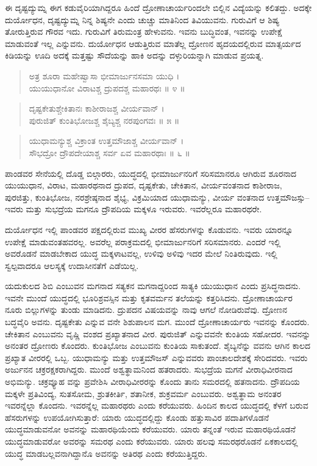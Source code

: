 ಈ ದೃಷ್ಟದ್ಯುಮ್ನ ಈಗ ಕಡುವೈರಿಯಾಗಿದ್ದರೂ ಹಿಂದೆ ದ್ರೋಣಾಚಾರ್ಯರಿಂದಲೇ ಬಿಲ್ಲಿನ ವಿದ್ಯೆಯನ್ನು ಕಲಿತದ್ದು. ಅದಕ್ಕೇ ದುರ್ಯೋಧನ, ದೃಷ್ಟದ್ಯುಮ್ನ ನಿನ್ನ ಶಿಷ್ಯನೇ ಎಂದು ಚುಚ್ಚು ಮಾತಿನಿಂದ ತಿವಿಯುವನು. ಗುರುವಿಗೆ ಆ ಶಿಷ್ಯ ತೋರುತ್ತಿರುವ ಗೌರವ ಇದು. ಗುರುವಿಗೆ ತಿರುಮಂತ್ರ ಹೇಳುವನು. ಇವನು ಬುದ್ಧಿವಂತ, ಇವನನ್ನು ಉಪೇಕ್ಷೆ ಮಾಡುವಂತೆ ಇಲ್ಲ ಎನ್ನುವನು. ದುರ್ಯೋಧನ ಆಡುತ್ತಿರುವ ಮಾತೆಲ್ಲ ದ್ರೋಣನ ಹೃದಯದಲ್ಲಿರುವ ಮಾತ್ಸರ್ಯದ ಕಿಡಿಯನ್ನು ಊದಿ ಅದಕ್ಕೆ ಮತ್ತಷ್ಟು ಸೌದೆಯನ್ನು ಹಾಕಿ ಅದನ್ನು ದಳ್ಳುರಿಯನ್ನಾಗಿ ಮಾಡುವ ಪ್ರಯತ್ನ.

\begin{verse}
ಅತ್ರ ಶೂರಾ ಮಹೇಷ್ವಾಸಾ ಭೀಮಾರ್ಜುನಸಮಾ ಯುಧಿ ।\\ಯುಯುಧಾನೋ ವಿರಾಟಶ್ಚ ದ್ರುಪದಶ್ಚ ಮಹಾರಥಃ \num{॥ ೪ ॥}
\end{verse}

\begin{verse}
ದೃಷ್ಟಕೇತುಶ್ಚೇಕಿತಾನಃ ಕಾಶೀರಾಜಶ್ಚ ವೀರ್ಯವಾನ್ ।\\ಪುರುಜಿತ್ ಕುಂತಿಭೋಜಶ್ಚ ಶೈಬ್ಯಶ್ಚ ನರಪುಂಗವಃ \num{॥ ೫ ॥}
\end{verse}

\begin{verse}
ಯುಧಾಮನ್ಯುಶ್ಚ ವಿಕ್ರಾಂತ ಉತ್ತಮೌಜಾಶ್ಚ ವೀರ್ಯವಾನ್ ।\\ಸೌಭದ್ರೋ ದ್ರೌಪದೇಯಾಶ್ಚ ಸರ್ವ ಏವ ಮಹಾರಥಾಃ \num{॥ ೬ ॥}
\end{verse}

{\small ಪಾಂಡವರ ಸೇನೆಯಲ್ಲಿ ದೊಡ್ಡ ಬಿಲ್ಗಾರರು, ಯುದ್ಧದಲ್ಲಿ ಭೀಮಾರ್ಜುನರಿಗೆ ಸರಿಸಮಾನರೂ ಆಗಿರುವ ಶೂರನಾದ ಯುಯುಧಾನ, ವಿರಾಟ, ಮಹಾರಥನಾದ ದ್ರುಪದ, ದೃಷ್ಟಕೇತು, ಚೇಕಿತಾನ, ವೀರ್ಯವಂತನಾದ ಕಾಶೀರಾಜ, ಪುರಜಿತ್ತು, ಕುಂತಿಭೋಜ, ನರಶ್ರೇಷ್ಠನಾದ ಶೈಭ್ಯ, ವಿಕ್ರಮಿಯಾದ ಯುಧಾಮನ್ಯು, ವೀರ್ಯ ವಂತನಾದ ಉತ್ತಮೌಜಸ್ಸು–ಇವರು ಮತ್ತು ಸುಭದ್ರೆಯ ಮಗನೂ ದ್ರೌಪದಿಯ ಮಕ್ಕಳೂ ಇರುವರು. ಇವರೆಲ್ಲರೂ ಮಹಾರಥರೇ.}

ದುರ್ಯೋಧನ ಇಲ್ಲಿ ಪಾಂಡವರ ಪಕ್ಷದಲ್ಲಿರುವ ಮುಖ್ಯ ವೀರರ ಹೆಸರುಗಳನ್ನು ಕೊಡುವನು. ಇವರು ಯಾರನ್ನೂ ಉಪೇಕ್ಷೆ ಮಾಡುವಂತಹವರಲ್ಲ. ಅವರೆಲ್ಲ ಪರಾಕ್ರಮದಲ್ಲಿ ಭೀಮಾರ್ಜುನರಿಗೆ ಸರಿಸಮಾನರು. ಎಂದರೆ ಇಲ್ಲಿ ಅವರೊಡನೆ ಮಾಡಬೇಕಾದ ಯುದ್ಧ ಮಕ್ಕಳಾಟವಲ್ಲ, ಉಳಿವು ಅಳಿವು ಇದರ ಮೇಲೆ ನಿಂತಿರುವುದು. ಇಲ್ಲಿ ಸ್ವಲ್ಪವಾದರೂ ಆಲಸ್ಯಕ್ಕೆ ಉದಾಸೀನತೆಗೆ ಎಡೆಯಿಲ್ಲ.

ಯದುಕುಲದ ಶಿಬಿ ಎಂಬುವನ ಮಗನಾದ ಸತ್ಯಕನ ಮಗನಾದ್ದರಿಂದ ಸಾತ್ಯಕಿ ಯುಯುಧಾನ ಎಂದು ಪ್ರಸಿದ್ಧನಾದನು. ಇವನೇ ಮುಂದೆ ಯುದ್ಧದಲ್ಲಿ ಭೂರಿಶ್ರವಸ್ಸಿನ ಮತ್ತು ಕೃತವರ್ಮನ ತಲೆಯನ್ನು ಕತ್ತರಿಸಿದನು. ದ್ರೋಣಾಚಾರ್ಯರ ನೂರು ಬಿಲ್ಲುಗಳನ್ನು ತುಂಡು ಮಾಡಿದನು. ದ್ರುಪದನ ವಿಷಯವನ್ನು ನಾವು ಆಗಲೆ ನೋಡಿರುವೆವು. ದ್ರೋಣನ ಬದ್ಧವೈರಿ ಅವನು. ದೃಷ್ಟಕೇತು ಎನ್ನುವ ವನೇ ಶಿಶುಪಾಲನ ಮಗ. ಮುಂದೆ ದ್ರೋಣಾಚಾರ್ಯರು ಇವನನ್ನು ಕೊಂದರು. ಚೇಕಿತಾನ ಎಂಬುವನು ವೃಷ್ಣಿ ವಂಶದ ಪ್ರಖ್ಯಾತನಾದ ವೀರ. ಪುರುಜಿತ್ ಎನ್ನುವವನೇ ಕುಂತಿಯ ಸಹೋದರ. ಇವನನ್ನು ಅನಂತರ ದ್ರೋಣರು ಕೊಂದರು. ಕುಂತಿಭೋಜ ಎಂಬುವನು ಕುಂತಿಯ ಸಾಕುತಂದೆ. ಶೈಬ್ಯನೆನ್ನು ವವನು ಆಗಿನ ಕಾಲದ ಪ್ರಖ್ಯಾತ ವೀರರಲ್ಲಿ ಒಬ್ಬ. ಯುಧಾಮನ್ಯು ಮತ್ತು ಉತ್ತಮೌಜಸ್ ಎನ್ನುವವರು ಪಾಂಚಾಲದೇಶಕ್ಕೆ ಸೇರಿದವರು. ಇವರು ಅರ್ಜುನನ ಚಕ್ರರಕ್ಷಕರಾಗಿದ್ದರು. ಮುಂದೆ ಅಶ್ವತ್ಥಾಮನಿಂದ ಹತರಾದರು. ಸುಭದ್ರೆಯ ಮಗನೆ ವೀರಾಧಿವೀರನಾದ ಅಭಿಮನ್ಯು. ಚಕ್ರವ್ಯೂಹ ವನ್ನು ಪ್ರವೇಶಿಸಿ ವೀರಾಧಿವೀರರನ್ನು ಕೊಂದು ತಾನು ಸಮರದಲ್ಲಿ ಹತನಾದನು. ದ್ರೌಪದಿಯ ಮಕ್ಕಳೇ ಪ್ರತಿವಿಂದ್ಯ, ಸುತಸೋಮ, ಶ್ರುತಕೀರ್ತಿ, ಶತಾನೀಕ, ಶುಕ್ರವರ್ಮ ಎಂಬುವರು. ಅಶ್ವತ್ಥಾಮ ಅನಂತರ ಇವರನ್ನೆಲ್ಲಾ ಕೊಂದನು. ಇವರನ್ನೆಲ್ಲ ಮಹಾರಥರು ಎಂದು ಕರೆಯುವರು. ಹಿಂದಿನ ಕಾಲದ ಯುದ್ಧದಲ್ಲಿ ಕೆಳಗೆ ಬರುವ ಹೆಸರುಗಳನ್ನು ಉಪಯೋಗಿಸುತ್ತಾರೆ: ಯಾರು ಯುದ್ಧದಲ್ಲಿದ್ದು ಕೊಂಡು ಹತ್ತುಸಾವಿರ ಪದಾತಿಗಳೊಡನೆ ಯುದ್ಧಮಾಡುವನೋ ಅವನನ್ನು ಮಹಾರಥಿಯೆಂದು ಕರೆಯುವರು. ಯಾರು ತನ್ನಂತೆ ಇರುವ ಮಹಾರಥಿಯೊಡನೆ ಯುದ್ಧಮಾಡುವರೋ ಅವರನ್ನು ಸಮರಥ ಎಂದು ಕರೆಯುವರು. ಯಾರು ಹಲವು ಸಮರಥರೊಡನೆ ಏಕಕಾಲದಲ್ಲಿ ಯುದ್ಧ ಮಾಡಬಲ್ಲವನಾಗಿದ್ದಾನೊ ಅವನನ್ನು ಅತಿರಥ ಎಂದು ಕರೆಯುತ್ತಿದ್ದರು.

